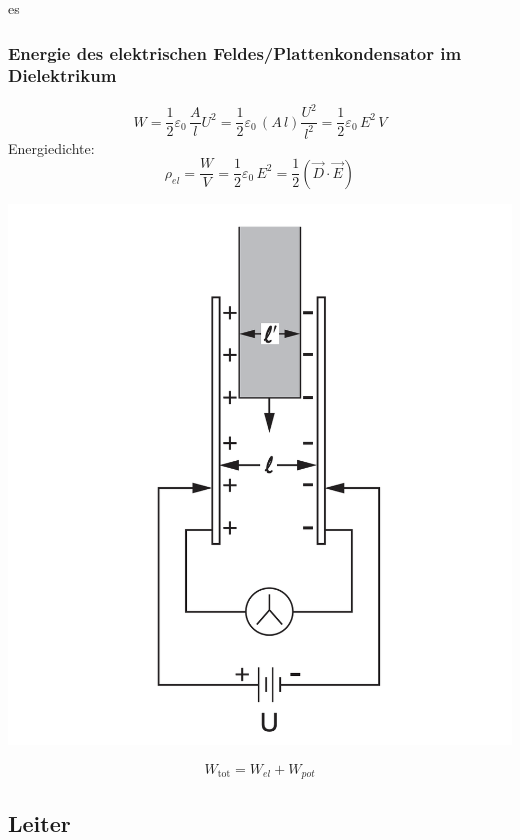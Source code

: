 es\documentclass[a4paper, fontsize=8pt, landscape]{scrartcl}
\begin{document}
\begin{multicols*}{4}
    \subsubsection{Energie des elektrischen Feldes/Plattenkondensator im Dielektrikum}
        \[W = \frac{1}{2}\varepsilon_0\,\frac{A}{l}U^2 = \frac{1}{2}\varepsilon_0\,(A\,l)\frac{U^2}{l^2} = \frac{1}{2}\varepsilon_0\,E^2\,V\]
        Energiedichte:
        \[\rho_{el} = \frac{W}{V} = \frac{1}{2}\varepsilon_0\,E^2 = \frac{1}{2}(\vec D \cdot \vec E)\]
        \begin{center}
            \includegraphics[scale=0.1]{Images/Dielektrikum.png}
        \end{center}
        \[W_{\text{tot}} = W_{el} + W_{pot}\]

\subsection{Leiter}

\end{multicols*}
\end{document}
